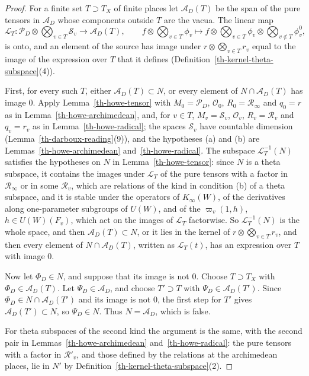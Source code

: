 \begin{proof}
For a finite set $T\supset T_X$ of finite places let $\mathcal A_D(T)$ be the
span of the pure tensors in $\mathcal A_D$ whose components outside $T$ are the
vacua. The linear map
\[
\mathcal L_T\colon\mathcal P_D\otimes\bigotimes_{v\in T}\mathcal S_v\to\mathcal A_D(T),\qquad
f\otimes\bigotimes_{v\in T}\phi_v\mapsto f\otimes\bigotimes_{v\in T}\phi_v\otimes\bigotimes_{v\notin T}\phi^0_v,
\]
is onto, and an element of the source has image under
$r\otimes\bigotimes_{v\in T}r_v$ equal to the image of the expression over $T$
that it defines (Definition~\ref{th-kernel-theta-subspace}(4)).

First, for every such $T$, either $\mathcal A_D(T)\subset N$, or every
element of $N\cap\mathcal A_D(T)$ has image $0$. Apply
Lemma~\ref{th-howe-tensor} with $M_0=\mathcal P_D$, $\mathcal O_0$,
$R_0=\mathcal R_\infty$ and $q_0=r$ as in Lemma~\ref{th-howe-archimedean},
and, for $v\in T$, $M_v=\mathcal S_v$, $\mathcal O_v$, $R_v=\mathcal R_v$
and $q_v=r_v$ as in Lemma~\ref{th-howe-radical}; the spaces $\mathcal S_v$
have countable dimension (Lemma~\ref{th-darboux-reading}(9)), and the
hypotheses (a) and (b) are Lemmas~\ref{th-howe-archimedean}
and~\ref{th-howe-radical}. The subspace $\mathcal L_T^{-1}(N)$ satisfies the
hypotheses on $N$ in Lemma~\ref{th-howe-tensor}: since $N$ is a theta
subspace, it contains the images under $\mathcal L_T$ of the pure tensors
with a factor in $\mathcal R_\infty$ or in some $\mathcal R_v$, which are
relations of the kind in condition (b) of a theta subspace, and it is stable
under the operators of $K_\infty(W)$, of the derivatives along one-parameter
subgroups of $U(W)$, and of the $\varpi_v(1,h)$, $h\in U(W)(F_v)$, which act
on the images of $\mathcal L_T$ factorwise. So $\mathcal L_T^{-1}(N)$ is the
whole space, and then $\mathcal A_D(T)\subset N$, or it lies in the kernel of
$r\otimes\bigotimes_{v\in T}r_v$, and then every element of
$N\cap\mathcal A_D(T)$, written as $\mathcal L_T(t)$, has an expression over
$T$ with image $0$.

Now let $\Phi_D\in N$, and suppose that its image is not $0$. Choose
$T\supset T_X$ with $\Phi_D\in\mathcal A_D(T)$. Let
$\Psi_D\in\mathcal A_D$, and choose $T'\supset T$ with
$\Psi_D\in\mathcal A_D(T')$. Since $\Phi_D\in N\cap\mathcal A_D(T')$ and its
image is not $0$, the first step for $T'$ gives
$\mathcal A_D(T')\subset N$, so $\Psi_D\in N$. Thus $N=\mathcal A_D$, which is
false.

For theta subspaces of the second kind the argument is the same, with the
second pair in Lemmas~\ref{th-howe-archimedean} and~\ref{th-howe-radical}:
the pure tensors with a factor in $\mathcal R'_v$, and those defined by the
relations at the archimedean places, lie in $N'$ by
Definition~\ref{th-kernel-theta-subspace}(2).
\end{proof}

